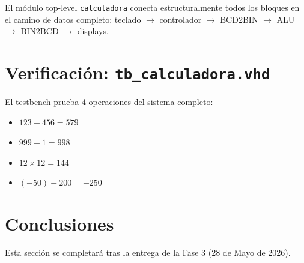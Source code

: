 \documentclass[memoria_final]{subfiles}
\begin{document}
El módulo top-level \texttt{calculadora} conecta estructuralmente todos los
bloques en el camino de datos completo: teclado $\to$ controlador $\to$
BCD2BIN $\to$ ALU $\to$ BIN2BCD $\to$ displays.

\section{Verificación: \texttt{tb\_calculadora.vhd}}

El testbench prueba 4 operaciones del sistema completo:
\begin{itemize}
  \item $123 + 456 = 579$
  \item $999 - 1 = 998$
  \item $12 \times 12 = 144$
  \item $(-50) - 200 = -250$
\end{itemize}

\section{Conclusiones}

\begin{tcolorbox}[colback=SoftBlue,colframe=MainBlue,boxrule=0.8pt,arc=2pt,
  left=0.5cm,right=0.5cm,top=0.3cm,bottom=0.3cm]
  \small\faInfoCircle\enspace Esta sección se completará tras la entrega
  de la Fase 3 (28 de Mayo de 2026).
\end{tcolorbox}
\end{document}
